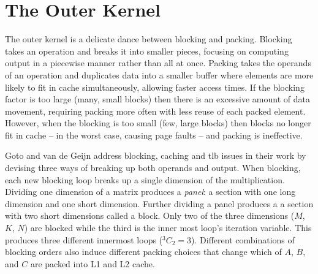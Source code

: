 \documentclass[\main/thesis.tex]{subfiles}
\begin{document}
\section{The Outer Kernel}
The outer kernel is a delicate dance between blocking and packing.
Blocking takes an operation and breaks it into smaller pieces, focusing on computing output in a piecewise manner rather than all at once.
Packing takes the operands of an operation and duplicates data into a smaller buffer where elements are more likely to fit in cache simultaneously, allowing faster access times.
If the blocking factor is too large (\ie many, small blocks) then there is an excessive amount of data movement, requiring packing more often with less reuse of each packed element.
However, when the blocking is too small (\ie few, large blocks) then blocks no longer fit in cache -- in the worst case, causing page faults -- and packing is ineffective.

Goto and van de Geijn address blocking, caching and \gls{tlb} issues in their work by devising three ways of breaking up both operands and output.
When blocking, each new blocking loop breaks up a single dimension of the multiplication.
Dividing one dimension of a matrix produces a \emph{panel}: a section with one long dimension and one short dimension.
Further dividing a panel produces a a section with two short dimensions called a block.
Only two of the three dimensions ($M$, $K$, $N$) are blocked while the third is the inner most loop's iteration variable.
This produces three different innermost loops (${}^{3}C_{2}=3$).
Different combinations of blocking orders also induce different packing choices that change which of $A$, $B$, and $C$ are packed into L1 and L2 cache.
\end{document}
